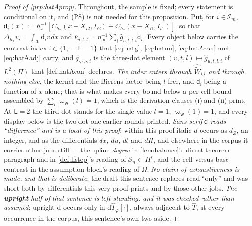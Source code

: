 \begin{proof}[Proof of \cref{prp:hatAprop}]
Throughout, the sample is fixed; every statement is conditional on it, and (P8) is not needed for this
proposition. Put, for $i\in\mathcal I_m$,
$\mathsf d_i(x):=h_x^{-1}[C_{h_x}(x-X_{i2},I_{i2})-C_{h_x}(x-X_{i1},I_{i1})]$, so that
$\Delta_{h_x}v_i=\int_{\mathcal X}\mathsf d_i v\,dx$ and
$\hat\nu_{u,t,l}=n_{\mathrm m}^{-1}\sum_i\hat g_{u,t,l,i}\mathsf d_i$.
Every object below carries the contrast index $l\in\{1,\dots,\mathsf L-1\}$ that \eqref{eq:hatg},
\eqref{eq:hatnu}, \eqref{eq:hatAcon} and \eqref{eq:hatAadj} carry, and $\hat g_{\cdot,\cdot,\cdot,i}$ is
the three-dot element $(u,t,l)\mapsto\hat g_{u,t,l,i}$ of $L^{2}(\Pi)$ that \cref{def:hatAcon} declares.
\emph{The index enters through $\widehat{\widetilde W}_{i,l}$ and through nothing else}, the kernel and
the Bierens factor being $l$-free, and $\mathsf d_i$ being a function of $x$ alone; that is what makes
every bound below a per-cell bound assembled by $\sum_l\varpi_{\mathsf w}(l)=1$, which is the derivation
clauses \textup{(i)} and \textup{(ii)} print. At $\mathsf L=2$ the third dot stands for the single
value $l=1$, $\varpi_{\mathsf w}(1)=1$, and every display below is the two-dot one earlier rounds
printed.
\emph{Sans-serif $\mathsf d$ reads ``difference'' and is a local of this proof}: within this proof
italic $d$ occurs as $d_Z$, an integer, and as the differentials $dx$, $du$, $dt$ and $d\Pi$, and
elsewhere in the corpus it carries other jobs still --- the spline \emph{degree} in
\cref{lem:balance}'s direct-theorem paragraph and in \cref{def:lfstep}'s reading of
$\mathcal S_n\subset H^{s}$, and the
cell-versus-base contrast in the assumption block's reading of $\Omega$. \emph{No claim of
exhaustiveness is made, and that is deliberate}: the draft this sentence replaces read ``only'' and
was short both by differentials this very proof prints and by those other jobs. \emph{The
\textbf{upright} half of that sentence is left standing, and it was checked rather than assumed}:
upright $\mathrm d$ occurs only in $\mathrm d\hat T_\varphi[\cdot]$, always adjacent to $\hat T$, at
every occurrence in the corpus, this sentence's own two aside.


\end{proof}
